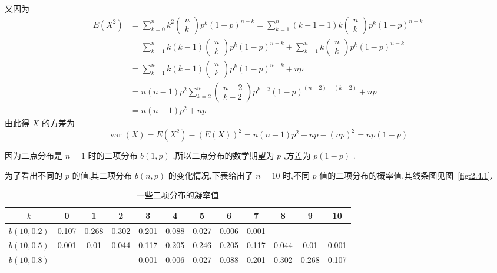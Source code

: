 又因为
\[
\begin{array}{ll}
{E\left(X^{2}\right)} & {=\sum_{k=0}^{n} k^{2} \left( 
	\begin{array}{c}
	{n} \\ 
	{k}
	\end{array}
	\right) 
	p^{k}(1-p)^{n-k}=\sum_{k=1}^{n}(k-1+1) k \left( 
	\begin{array}{c}{n} \\ 
	{k}
	\end{array}
	\right) 
	p^{k}(1-p)^{n-k}} \\ 
{}&{=\sum_{k=1}^{n} k(k-1) \left( 
	\begin{array}{c}{n} \\ 
	{k}
	\end{array}
	\right) 
	p^{k}(1-p)^{n-k}+\sum_{k=1}^{n} k \left( 
	\begin{array}{c}{n} \\ 
	{k}
	\end{array}
	\right) 
	p^{k}(1-p)^{n-k}} \\ 
{}&{=\sum_{k=1}^{n} k(k-1) \left( 
	\begin{array}{c}{n} \\ 
	{k}
	\end{array}
	\right) 
	p^{k}(1-p)^{n-k}+n p} \\ 
{}&{=n(n-1) p^{2} \sum_{k=2}^{n} \left( 
	\begin{array}{c}{n-2} \\ 
	{k-2}
	\end{array}
	\right) 
	p^{k-2}(1-p)^{(n-2)-(k-2)}+n p} \\ 
{}&{=n(n-1) p^{2}+n p}
\end{array}
\]
由此得 $ X $ 的方差为
\[
\operatorname{var}(X)=E\left(X^{2}\right)-(E(X))^{2}=n(n-1) p^{2}+n p-(n p)^{2}=n p(1-p)
\]

因为二点分布是 $ n=1 $ 时的二项分布 $ b(1,p) $ ,所以二点分布的数学期望为 $ p $ ,方差为 $ p(1-p) $ .

为了看出不同的 $ p $ 的值,其二项分布 $ b(n,p) $ 的变化情况,下表给出了 $ n=10 $ 时,不同 $ p $ 值的二项分布的概率值,其线条图见图~\ref{fig:2.4.1}.

\begin{table}[htbp]
	\centering
	\caption{一些二项分布的凝率值}
	\begin{tabular}{c|ccccccccccc}
		\toprule
		 $ k $ & 0     & 1     & 2     & 3     & 4     & 5     & 6     & 7     & 8     & 9     & 10 \\\midrule
		 $ b(10,0.2) $ & 0.107 & 0.268 & 0.302 & 0.201 & 0.088 & 0.027 & 0.006 & 0.001 &       &       &  \\
		 $ b(10,0.5) $ & 0.001 & 0.01  & 0.044 & 0.117 & 0.205 & 0.246 & 0.205 & 0.117 & 0.044 & 0.01  & 0.001 \\
		 $ b(10,0.8) $ &       &       &       & 0.001 & 0.006 & 0.027 & 0.088 & 0.201 & 0.302 & 0.268 & 0.107 \\\bottomrule
	\end{tabular}%
	\label{tab:2.4.1}%
\end{table}%


